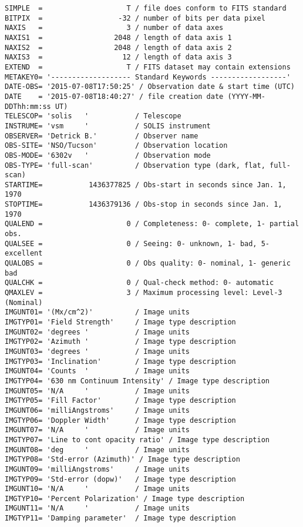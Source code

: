 \documentclass[11pt]{article}
\begin{document}
\begin{verbatim}
SIMPLE  =                    T / file does conform to FITS standard
BITPIX  =                  -32 / number of bits per data pixel
NAXIS   =                    3 / number of data axes
NAXIS1  =                 2048 / length of data axis 1
NAXIS2  =                 2048 / length of data axis 2
NAXIS3  =                   12 / length of data axis 3
EXTEND  =                    T / FITS dataset may contain extensions
METAKEY0= '------------------- Standard Keywords ------------------'
DATE-OBS= '2015-07-08T17:50:25' / Observation date & start time (UTC)
DATE    = '2015-07-08T18:40:27' / file creation date (YYYY-MM-DDThh:mm:ss UT)
TELESCOP= 'solis   '           / Telescope
INSTRUME= 'vsm     '           / SOLIS instrument
OBSERVER= 'Detrick B.'         / Observer name
OBS-SITE= 'NSO/Tucson'         / Observation location
OBS-MODE= '6302v   '           / Observation mode
OBS-TYPE= 'full-scan'          / Observation type (dark, flat, full-scan)
STARTIME=           1436377825 / Obs-start in seconds since Jan. 1, 1970
STOPTIME=           1436379136 / Obs-stop in seconds since Jan. 1, 1970
QUALEND =                    0 / Completeness: 0- complete, 1- partial obs.
QUALSEE =                    0 / Seeing: 0- unknown, 1- bad, 5- excellent
QUALOBS =                    0 / Obs quality: 0- nominal, 1- generic bad
QUALCHK =                    0 / Qual-check method: 0- automatic
QMAXLEV =                    3 / Maximum processing level: Level-3 (Nominal)
IMGUNT01= '(Mx/cm^2)'          / Image units
IMGTYP01= 'Field Strength'     / Image type description
IMGUNT02= 'degrees '           / Image units
IMGTYP02= 'Azimuth '           / Image type description
IMGUNT03= 'degrees '           / Image units
IMGTYP03= 'Inclination'        / Image type description
IMGUNT04= 'Counts  '           / Image units
IMGTYP04= '630 nm Continuum Intensity' / Image type description
IMGUNT05= 'N/A     '           / Image units
IMGTYP05= 'Fill Factor'        / Image type description
IMGUNT06= 'milliAngstroms'     / Image units
IMGTYP06= 'Doppler Width'      / Image type description
IMGUNT07= 'N/A     '           / Image units
IMGTYP07= 'Line to cont opacity ratio' / Image type description
IMGUNT08= 'deg     '           / Image units
IMGTYP08= 'Std-error (Azimuth)' / Image type description
IMGUNT09= 'milliAngstroms'     / Image units
IMGTYP09= 'Std-error (dopw)'   / Image type description
IMGUNT10= 'N/A     '           / Image units
IMGTYP10= 'Percent Polarization' / Image type description
IMGUNT11= 'N/A     '           / Image units
IMGTYP11= 'Damping parameter'  / Image type description

\end{verbatim}
\end{document}
